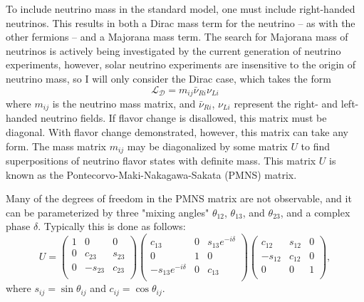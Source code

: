 To include neutrino mass in the standard model, one must include right-handed neutrinos.
This results in both a Dirac mass term for the neutrino -- as with the other fermions -- and a Majorana mass term.
The search for Majorana mass of neutrinos is actively being investigated by the current generation of neutrino experiments, however, solar neutrino experiments are insensitive to the origin of neutrino mass, so I will only consider the Dirac case, which takes the form
\begin{equation}
\mathscr{L_D} = m_{ij} \bar{\nu}_{Ri} \nu_{Li} 
\end{equation}
where $m_{ij}$ is the neutrino mass matrix, and $\bar{\nu}_{Ri}$, $\nu_{Li}$ represent the right- and left-handed neutrino fields.
If flavor change is disallowed, this matrix must be diagonal.
With flavor change demonstrated, however, this matrix can take any form.
The mass matrix $m_{ij}$ may be diagonalized by some matrix $U$ to find superpositions of neutrino flavor states with definite mass.
This matrix $U$ is known as the Pontecorvo-Maki-Nakagawa-Sakata (PMNS) matrix.

Many of the degrees of freedom in the PMNS matrix are not observable, and it can be parameterized by three "mixing angles" $\theta_{12}$, $\theta_{13}$, and $\theta_{23}$, and a complex phase $\delta$.
Typically this is done as follows:
\begin{equation}
U = 
\left(
\begin{array}{ccc}
1 & 0        & 0\\
0 & c_{23}   & s_{23}\\
0 & -s_{23}  & c_{23}\\
\end{array}
\right)
\left(
\begin{array}{ccc}
c_{13}              & 0  & s_{13}e^{-i\delta} \\
0                   & 1  & 0                  \\
-s_{13}e^{-i\delta} & 0  & c_{13}             \\
\end{array}
\right)
\left(
\begin{array}{ccc}
c_{12}  & s_{12} & 0 \\
-s_{12} & c_{12} & 0 \\
0       & 0      & 1 \\
\end{array}
\right),
\end{equation}
where $s_{ij} = \sin{\theta_{ij}}$ and $c_{ij} = \cos{\theta_{ij}}$.


